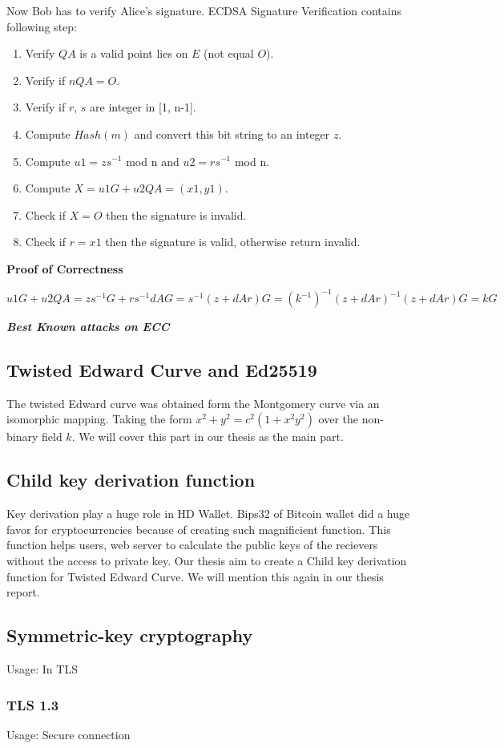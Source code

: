 Now Bob has to verify Alice's signature. ECDSA Signature Verification contains following step:
\begin{enumerate}
	\item Verify $QA$ is a valid point lies on $E$ (not equal $O$).
	\item Verify if $nQA = O$. 
	\item Verify if $r$, $s$ are integer in [1, n-1].
	\item Compute $Hash(m)$ and convert this bit string to an integer $z$.
	\item Compute $u1=zs^{-1}$ mod n and $u2= rs^{-1}$ mod n.
	\item Compute $X = u1G + u2QA = (x1, y1)$.
	\item Check if $X = O$ then the signature is invalid.
	\item Check if $r = x1$ then the signature is valid, otherwise return invalid.
\end{enumerate}

{\textbf{Proof of Correctness}}

$u1G + u2QA = zs^{-1}G + rs^{-1}dAG = s^{-1}(z+dAr)G =(k^{-1})^{-1}(z+dAr)^{-1}(z+dAr)G = kG$

\bigskip
{\textit {\textbf{Best Known attacks on ECC}}}

\subsection{Twisted Edward Curve and Ed25519}
The twisted Edward curve was obtained form the Montgomery curve via an isomorphic mapping.
Taking the form $x^2 + y^2 = c^2(1+ x^2y^2)$ over the non-binary field $k$.
We will cover this part in our thesis as the main part.

\subsection{Child key derivation function}
Key derivation play a huge role in HD Wallet. 
Bips32 of Bitcoin wallet did a huge favor for cryptocurrencies because of creating such magnificient function.
This function helps users, web server to calculate the public keys of the recievers without the access to private key.
Our thesis aim to create a Child key derivation function for Twisted Edward Curve. 
We will mention this again in our thesis report.

\subsection{Symmetric-key cryptography}
\label{sec: Symmetric_keys}
Usage: In TLS

\subsubsection{TLS 1.3}
Usage: Secure connection


